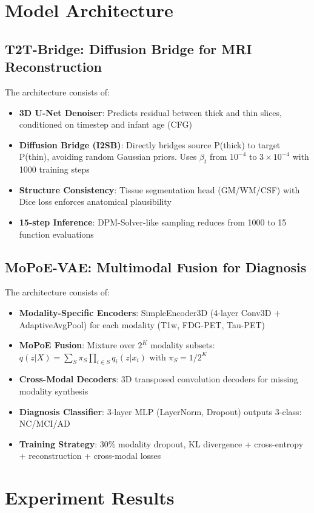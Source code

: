 \documentclass[11pt,a4paper]{article}
\begin{document}
\section{Model Architecture}

\subsection{T2T-Bridge: Diffusion Bridge for MRI Reconstruction}
The architecture consists of:
\begin{itemize}
\item \textbf{3D U-Net Denoiser}: Predicts residual between thick and thin slices, conditioned on timestep and infant age (CFG)
\item \textbf{Diffusion Bridge (I2SB)}: Directly bridges source P(thick) to target P(thin), avoiding random Gaussian priors. Uses $\beta_t$ from $10^{-4}$ to $3\times10^{-4}$ with 1000 training steps
\item \textbf{Structure Consistency}: Tissue segmentation head (GM/WM/CSF) with Dice loss enforces anatomical plausibility
\item \textbf{15-step Inference}: DPM-Solver-like sampling reduces from 1000 to 15 function evaluations
\end{itemize}

\subsection{MoPoE-VAE: Multimodal Fusion for Diagnosis}
The architecture consists of:
\begin{itemize}
\item \textbf{Modality-Specific Encoders}: SimpleEncoder3D (4-layer Conv3D + AdaptiveAvgPool) for each modality (T1w, FDG-PET, Tau-PET)
\item \textbf{MoPoE Fusion}: Mixture over $2^K$ modality subsets: $q(z|X)=\sum_{S}\pi_S \prod_{i\in S}q_i(z|x_i)$ with $\pi_S=1/2^K$
\item \textbf{Cross-Modal Decoders}: 3D transposed convolution decoders for missing modality synthesis
\item \textbf{Diagnosis Classifier}: 3-layer MLP (LayerNorm, Dropout) outputs 3-class: NC/MCI/AD
\item \textbf{Training Strategy}: 30\% modality dropout, KL divergence + cross-entropy + reconstruction + cross-modal losses
\end{itemize}

\section{Experiment Results}
\end{document}
